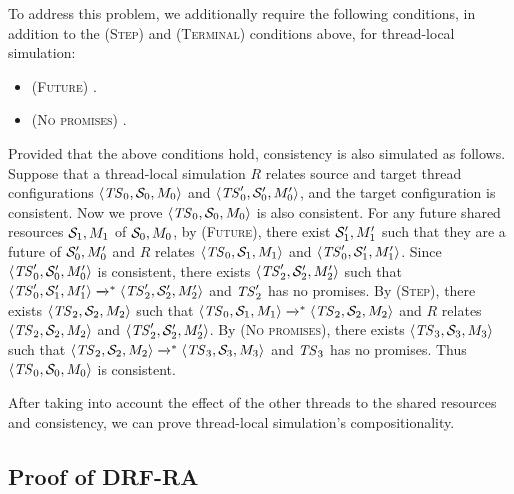 To address this problem, we additionally require the following conditions, in addition to the
\textsc{(Step)} and \textsc{(Terminal)} conditions above, for thread-local simulation:
%
\begin{itemize}
\item \textsc{(Future)} .
\item \textsc{(No promises)} .
\end{itemize}
%
\noindent Provided that the above conditions hold, consistency is also simulated as follows.
Suppose that a thread-local simulation $R$ relates source and target thread configurations
${\langle{\mathit{TS}_0,{\cal S}_0,M_0}\rangle}$ and ${\langle{\mathit{TS}'_0,{\cal S}'_0,M'_0}\rangle}$, and the target configuration is
consistent.  Now we prove ${\langle{\mathit{TS}_0,{\cal S}_0,M_0}\rangle}$ is also consistent.  For any future shared
resources ${\cal S}_1,M_1$ of ${\cal S}_0,M_0$, by \textsc{(Future)}, there exist ${\cal S}'_1,M'_1$
such that they are a future of ${\cal S}'_0,M'_0$ and $R$ relates ${\langle{\mathit{TS}_0,{\cal S}_1,M_1}\rangle}$ and
${\langle{\mathit{TS}'_0,{\cal S}'_1,M'_1}\rangle}$.  Since ${\langle{\mathit{TS}'_0,{\cal S}'_0,M'_0}\rangle}$ is consistent, there
exists ${\langle{\mathit{TS}'_2,{\cal S}'_2,M'_2}\rangle}$ such that
${\langle{\mathit{TS}'_0,{\cal S}'_1,M'_1}\rangle} \xrightarrow{}^* {\langle{\mathit{TS}'_2,{\cal S}'_2,M'_2}\rangle}$ and $\mathit{TS}'_2$ has no
promises.  By \textsc{(Step)}, there exists ${\langle{\mathit{TS}_2,{\cal S}_2,M_2}\rangle}$ such that
${\langle{\mathit{TS}_0,{\cal S}_1,M_1}\rangle} \xrightarrow{}^* {\langle{\mathit{TS}_2,{\cal S}_2,M_2}\rangle}$ and $R$ relates
${\langle{\mathit{TS}_2,{\cal S}_2,M_2}\rangle}$ and ${\langle{\mathit{TS}'_2,{\cal S}'_2,M'_2}\rangle}$.  By \textsc{(No promises)},
there exists ${\langle{\mathit{TS}_3,{\cal S}_3,M_3}\rangle}$ such that
${\langle{\mathit{TS}_2,{\cal S}_2,M_2}\rangle} \xrightarrow{}^* {\langle{\mathit{TS}_3,{\cal S}_3,M_3}\rangle}$ and $\mathit{TS}_3$ has no promises.
Thus ${\langle{\mathit{TS}_0,{\cal S}_0,M_0}\rangle}$ is consistent.

After taking into account the effect of the other threads to the shared resources and consistency,
we can prove thread-local simulation's compositionality.



\subsection{Proof of DRF-RA}
\label{sec:relaxed:proofs:drfra}

\newcommand{\ME}{\textrm{ME}}
\newcommand{\AccMode}{\mathrm{AM}}
\newcommand{\mesilent}{\mathtt{silent}}
\newcommand{\meread}{\mathtt{read}}
\newcommand{\mewrite}{\mathtt{write}}
\newcommand{\meupdate}{\mathtt{update}}
\newcommand{\mefence}{\mathtt{fence}}
\newcommand{\mesyscall}{\mathtt{syscall}}
\newcommand{\mcths}{\mathtt{ths}}
\newcommand{\mcgsc}{\mathtt{gsc}}
\newcommand{\mcmem}{\mathtt{mem}}
\newcommand{\twomsg}[2]{\tup{#1\text{\small@}#2}}

